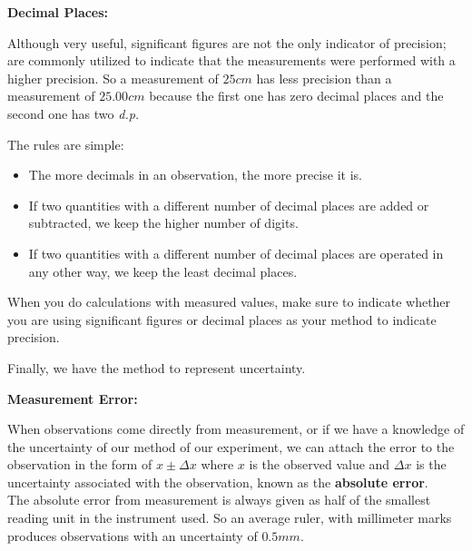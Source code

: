 \begin{center}
\textbf{Decimal Places:}
\end{center}

Although very useful, significant figures are not the only indicator of precision;  are commonly utilized to indicate that the measurements were performed with a higher precision. So a measurement of \(25cm\) has less precision than a measurement of \(25.00cm\) because the first one has zero decimal places and the second one has two \textit{d.p.}

The rules are simple: 

\begin{adjustwidth}{0cm}{1cm}
\begin{itemize}
\item The more decimals in an observation, the more precise it is. 
\item If two quantities with a different number of decimal places are added or subtracted, we keep the higher number of digits.
\item If two quantities with a different number of decimal places are operated in any other way, we keep the least decimal places.
\end{itemize}
\end{adjustwidth}

When you do calculations with measured values, make sure to indicate whether you are using significant figures or decimal places as your method to indicate precision.

Finally, we have the  method to represent uncertainty. 

\vspace{0.5cm}
\begin{center}
\textbf{Measurement Error:}
\end{center}

When observations come directly from measurement, or if we have a knowledge of the uncertainty of our method of our experiment, we can attach the error to the observation in the form of \(x \pm \Delta x\) where \(x\) is the observed value and \(\Delta x\) is the uncertainty associated with the observation, known as the \textbf{absolute error}.
\\

The absolute error from measurement is always given as half of the smallest reading unit in the instrument used. So an average ruler, with millimeter marks produces observations with an uncertainty of \(0.5mm\).
\\

